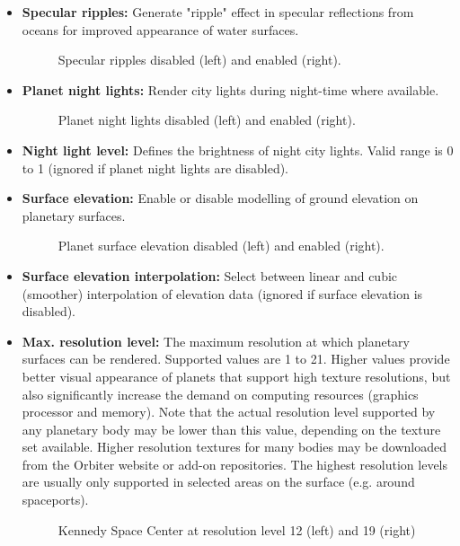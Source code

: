 \documentclass[Orbiter User Manual.tex]{subfiles}
\begin{document}
\begin{itemize}
\item \textbf{Specular ripples:} Generate "ripple" effect in specular reflections from oceans for improved appearance of water surfaces.

\begin{figure}[H]
	\centering
	\caption{Specular ripples disabled (left) and enabled (right).}
\end{figure}

\item \textbf{Planet night lights:} Render city lights during night-time where available.

\begin{figure}[H]
	\centering
	\caption{Planet night lights disabled (left) and enabled (right).}
\end{figure}

\item \textbf{Night light level:} Defines the brightness of night city lights. Valid range is 0 to 1 (ignored if planet night lights are disabled).
\item \textbf{Surface elevation:} Enable or disable modelling of ground elevation on planetary surfaces.

\begin{figure}[H]
	\centering
	\caption{Planet surface elevation disabled (left) and enabled (right).}
\end{figure}

\item \textbf{Surface elevation interpolation:} Select between linear and cubic (smoother) interpolation of elevation data (ignored if surface elevation is disabled).
\item \textbf{Max. resolution level:} The maximum resolution at which planetary surfaces can be rendered. Supported values are 1 to 21. Higher values provide better visual appearance of planets that support high texture resolutions, but also significantly increase the demand on computing resources (graphics processor and memory). Note that the actual resolution level supported by any planetary body may be lower than this value, depending on the texture set available. Higher resolution textures for many bodies may be downloaded from the Orbiter website or add-on repositories. The highest resolution levels are usually only supported in selected areas on the surface (e.g. around spaceports).

\begin{figure}[H]
	\centering
	\caption{Kennedy Space Center at resolution level 12 (left) and 19 (right)}
\end{figure}
\end{itemize}
\end{document}
